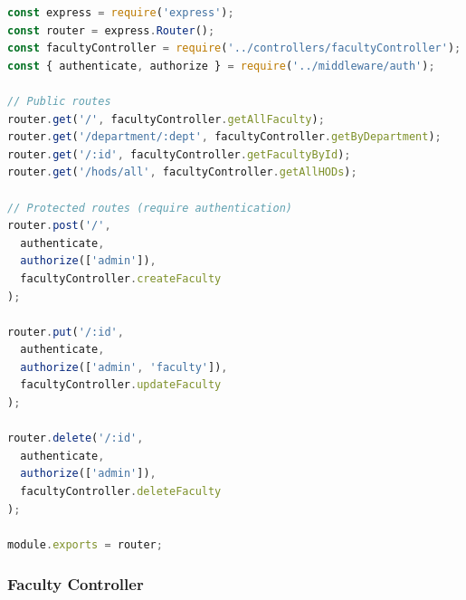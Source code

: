 \documentclass[12pt,a4paper]{report}
\begin{document}
\begin{lstlisting}[language=JavaScript, caption=Faculty API Routes]
const express = require('express');
const router = express.Router();
const facultyController = require('../controllers/facultyController');
const { authenticate, authorize } = require('../middleware/auth');

// Public routes
router.get('/', facultyController.getAllFaculty);
router.get('/department/:dept', facultyController.getByDepartment);
router.get('/:id', facultyController.getFacultyById);
router.get('/hods/all', facultyController.getAllHODs);

// Protected routes (require authentication)
router.post('/',
  authenticate,
  authorize(['admin']),
  facultyController.createFaculty
);

router.put('/:id',
  authenticate,
  authorize(['admin', 'faculty']),
  facultyController.updateFaculty
);

router.delete('/:id',
  authenticate,
  authorize(['admin']),
  facultyController.deleteFaculty
);

module.exports = router;
\end{lstlisting}

\subsubsection*{Faculty Controller}
\end{document}
